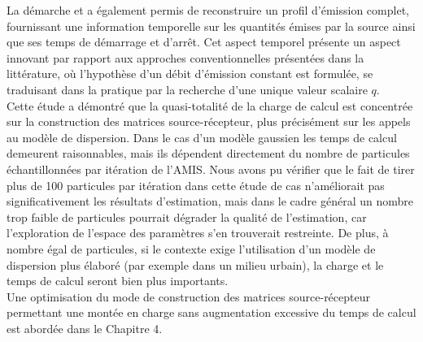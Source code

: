  La démarche et a également permis de reconstruire un profil d'émission complet, fournissant une information temporelle sur les quantités émises par la source ainsi que ses temps de démarrage et d'arrêt. Cet aspect temporel présente un aspect innovant par rapport aux approches conventionnelles présentées dans la littérature, où l'hypothèse d'un débit d'émission constant est formulée, se traduisant dans la pratique par la recherche d'une unique valeur scalaire $q$. \\
 
Cette étude a démontré que la quasi-totalité de la charge de calcul est concentrée sur la construction des matrices source-récepteur, plus précisément sur les appels au modèle de dispersion. Dans le cas d'un modèle gaussien les temps de calcul demeurent raisonnables, mais ils dépendent directement du nombre de particules échantillonnées par itération de l'AMIS. Nous avons pu vérifier que le fait de tirer plus de 100 particules par itération dans cette étude de cas n'améliorait pas significativement les résultats d'estimation, mais dans le cadre général un nombre trop faible de particules pourrait dégrader la qualité de l'estimation, car l'exploration de l'espace des paramètres s'en trouverait restreinte. De plus, à nombre égal de particules, si le contexte exige l'utilisation d'un modèle de dispersion plus élaboré (par exemple dans un milieu urbain), la charge et le temps de calcul seront bien plus importants. \\

Une optimisation du mode de construction des matrices source-récepteur permettant une montée en charge sans augmentation excessive du temps de calcul est abordée dans le Chapitre 4.



